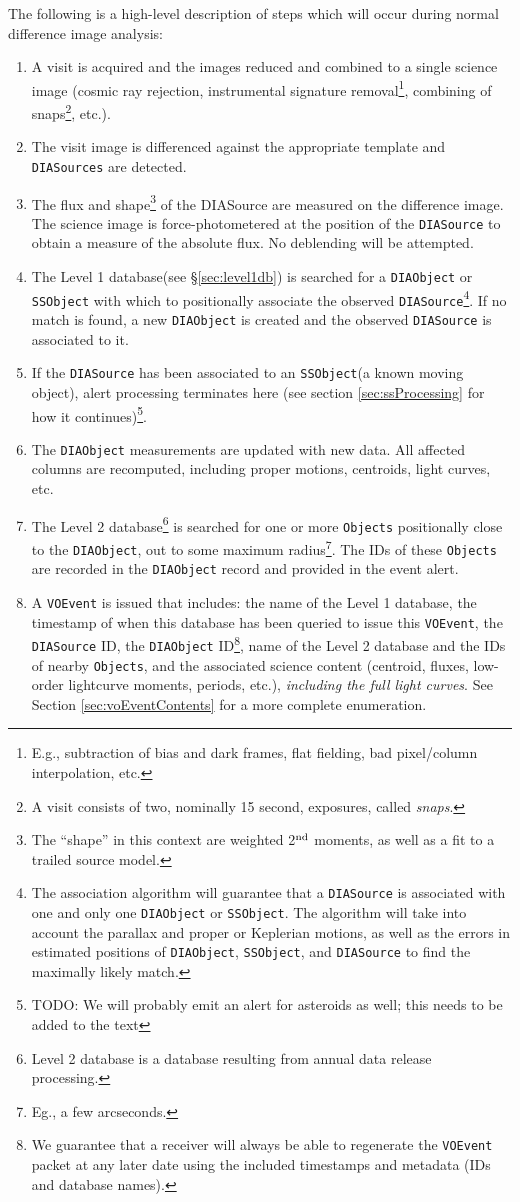 \documentclass[12pt]{article}
\newcommand{\code}[1]{\texttt{#1}}
\newcommand{\DIASource}{\code{DIASource}\xspace}
\newcommand{\DIASources}{\code{DIASources}\xspace}
\newcommand{\DIAObject}{\code{DIAObject}\xspace}
\newcommand{\DB}{{Level 1 database}\xspace}
\newcommand{\DR}{{Level 2 database}\xspace}
\newcommand{\Objects}{\code{Objects}\xspace}
\newcommand{\SSObject}{\code{SSObject}\xspace}
\newcommand{\VOEvent}{\code{VOEvent}\xspace}
\begin{document}
The following is a high-level description of steps which will occur during normal difference image analysis:
\begin{enumerate}
\item A visit is acquired and the images reduced and combined to a single science image (cosmic ray rejection, instrumental signature removal\footnote{E.g., subtraction of bias and dark frames, flat fielding, bad pixel/column interpolation, etc.}, combining of snaps\footnote{A visit consists of two, nominally 15 second, exposures, called {\em snaps}.}, etc.).
\item The visit image is differenced against the appropriate template and \DIASources are detected.
\item The flux and shape\footnote{The ``shape'' in this context are weighted 2$^{\rm nd}$ moments, as well as a fit to a trailed source model.} of the DIASource are measured on the difference image. The science image is force-photometered at the position of the \DIASource to obtain a measure of the absolute flux. No deblending will be attempted.
\item The \DB (see \S \ref{sec:level1db}) is searched for a \DIAObject or \SSObject with which to positionally associate the observed \DIASource\footnote{The association algorithm will guarantee that a \DIASource is associated with one and only one \DIAObject or \SSObject. The algorithm will take into account the parallax and proper or Keplerian motions, as well as the errors in estimated positions of \DIAObject, \SSObject, and \DIASource to find the maximally likely match.}. If no match is found, a new \DIAObject is created and the observed \DIASource is associated to it.
\item If the \DIASource has been associated to an \SSObject (a known moving object), alert processing terminates here (see section \ref{sec:ssProcessing} for how it continues)\footnote{TODO: We will probably emit an alert for asteroids as well; this needs to be added to the text}.
\item The \DIAObject measurements are updated with new data. All affected columns are recomputed, including proper motions, centroids, light curves, etc.
\item The \DR\footnote{\DR is a database resulting from annual data release processing.} is searched for one or more \Objects positionally close to the \DIAObject, out to some maximum radius\footnote{Eg., a few arcseconds.}. The IDs of these \Objects are recorded in the \DIAObject record and provided in the event alert.
\item A \VOEvent is issued that includes: the name of the \DB, the timestamp of when this database has been queried to issue this \VOEvent, the \DIASource ID, the \DIAObject ID\footnote{We guarantee that a receiver will always be able to regenerate the \VOEvent packet at any later date using the included timestamps and metadata (IDs and database names).}, name of the \DR and the IDs of nearby \Objects, and the associated science content (centroid, fluxes, low-order lightcurve moments, periods, etc.), {\em including the full light curves}. See Section \ref{sec:voEventContents} for a more complete enumeration.

\end{enumerate}
\end{document}
